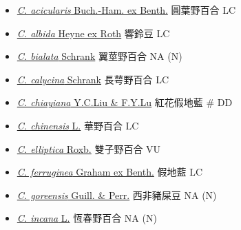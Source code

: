 \begin{itemize}
  \begin{itemize}
        \item[] \href{http://www.theplantlist.org/tpl1.1/search?q=Crotalaria+acicularis}{\textit{C. acicularis} Buch.-Ham. ex Benth.}   圓葉野百合   LC
        \item[] \href{http://www.theplantlist.org/tpl1.1/search?q=Crotalaria+albida}{\textit{C. albida} Heyne ex Roth}   響鈴豆   LC
        \item[] \href{http://www.theplantlist.org/tpl1.1/search?q=Crotalaria+bialata}{\textit{C. bialata} Schrank}   翼莖野百合   NA (N)
        \item[] \href{http://www.theplantlist.org/tpl1.1/search?q=Crotalaria+calycina}{\textit{C. calycina} Schrank}   長萼野百合   LC
        \item[] \href{http://www.theplantlist.org/tpl1.1/search?q=Crotalaria+chiayiana}{\textit{C. chiayiana} Y.C.Liu \& F.Y.Lu}   紅花假地藍  \# DD
        \item[] \href{http://www.theplantlist.org/tpl1.1/search?q=Crotalaria+chinensis}{\textit{C. chinensis} L.}   華野百合   LC
        \item[] \href{http://www.theplantlist.org/tpl1.1/search?q=Crotalaria+elliptica}{\textit{C. elliptica} Roxb.}   雙子野百合   VU
        \item[] \href{http://www.theplantlist.org/tpl1.1/search?q=Crotalaria+ferruginea}{\textit{C. ferruginea} Graham ex Benth.}   假地藍   LC
        \item[] \href{http://www.theplantlist.org/tpl1.1/search?q=Crotalaria+goreensis}{\textit{C. goreensis} Guill. \& Perr.}   西非豬屎豆   NA (N)
        \item[] \href{http://www.theplantlist.org/tpl1.1/search?q=Crotalaria+incana}{\textit{C. incana} L.}   恆春野百合   NA (N)

\end{itemize}
\end{itemize}
